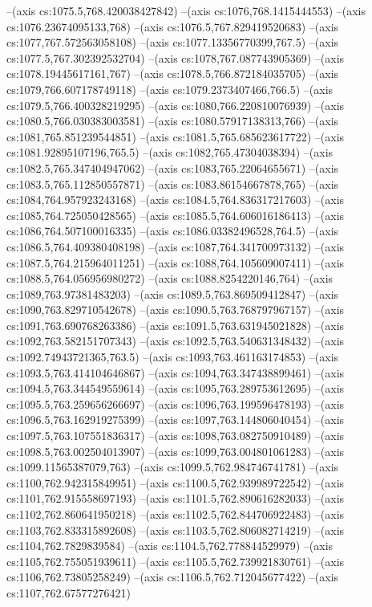 --(axis cs:1075.5,768.420038427842)
--(axis cs:1076,768.1415444553)
--(axis cs:1076.23674095133,768)
--(axis cs:1076.5,767.829419520683)
--(axis cs:1077,767.572563058108)
--(axis cs:1077.13356770399,767.5)
--(axis cs:1077.5,767.302392532704)
--(axis cs:1078,767.087743905369)
--(axis cs:1078.19445617161,767)
--(axis cs:1078.5,766.872184035705)
--(axis cs:1079,766.607178749118)
--(axis cs:1079.2373407466,766.5)
--(axis cs:1079.5,766.400328219295)
--(axis cs:1080,766.220810076939)
--(axis cs:1080.5,766.030383003581)
--(axis cs:1080.57917138313,766)
--(axis cs:1081,765.851239544851)
--(axis cs:1081.5,765.685623617722)
--(axis cs:1081.92895107196,765.5)
--(axis cs:1082,765.47304038394)
--(axis cs:1082.5,765.347404947062)
--(axis cs:1083,765.22064655671)
--(axis cs:1083.5,765.112850557871)
--(axis cs:1083.86154667878,765)
--(axis cs:1084,764.957923243168)
--(axis cs:1084.5,764.836317217603)
--(axis cs:1085,764.725050428565)
--(axis cs:1085.5,764.606016186413)
--(axis cs:1086,764.507100016335)
--(axis cs:1086.03382496528,764.5)
--(axis cs:1086.5,764.409380408198)
--(axis cs:1087,764.341700973132)
--(axis cs:1087.5,764.215964011251)
--(axis cs:1088,764.105609007411)
--(axis cs:1088.5,764.056956980272)
--(axis cs:1088.8254220146,764)
--(axis cs:1089,763.97381483203)
--(axis cs:1089.5,763.869509412847)
--(axis cs:1090,763.829710542678)
--(axis cs:1090.5,763.768797967157)
--(axis cs:1091,763.690768263386)
--(axis cs:1091.5,763.631945021828)
--(axis cs:1092,763.582151707343)
--(axis cs:1092.5,763.540631348432)
--(axis cs:1092.74943721365,763.5)
--(axis cs:1093,763.461163174853)
--(axis cs:1093.5,763.414104646867)
--(axis cs:1094,763.347438899461)
--(axis cs:1094.5,763.344549559614)
--(axis cs:1095,763.289753612695)
--(axis cs:1095.5,763.259656266697)
--(axis cs:1096,763.199596478193)
--(axis cs:1096.5,763.162919275399)
--(axis cs:1097,763.144806040454)
--(axis cs:1097.5,763.107551836317)
--(axis cs:1098,763.082750910489)
--(axis cs:1098.5,763.002504013907)
--(axis cs:1099,763.004801061283)
--(axis cs:1099.11565387079,763)
--(axis cs:1099.5,762.984746741781)
--(axis cs:1100,762.942315849951)
--(axis cs:1100.5,762.939989722542)
--(axis cs:1101,762.915558697193)
--(axis cs:1101.5,762.890616282033)
--(axis cs:1102,762.860641950218)
--(axis cs:1102.5,762.844706922483)
--(axis cs:1103,762.833315892608)
--(axis cs:1103.5,762.806082714219)
--(axis cs:1104,762.7829839584)
--(axis cs:1104.5,762.778844529979)
--(axis cs:1105,762.755051939611)
--(axis cs:1105.5,762.739921830761)
--(axis cs:1106,762.73805258249)
--(axis cs:1106.5,762.712045677422)
--(axis cs:1107,762.67577276421)
